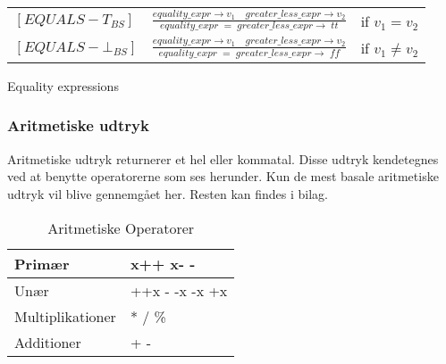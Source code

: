 \begin{semantik}
    \bgroup
    \def\arraystretch{3}
    \begin{table}[H]
    \centering
    \begin{tabular}{l c l}
        
        $[EQUALS-T_{BS}]$ &$\frac{equality\_expr \rightarrow v_1 \quad greater\_less\_expr \rightarrow v_2}{equality\_expr\;=\;greater\_less\_expr \rightarrow \; tt}$ & if $v_1 = v_2$ \\
        
        $[EQUALS-\bot_{BS}]$ &$\frac{equality\_expr \rightarrow v_1 \quad greater\_less\_expr \rightarrow v_2}{equality\_expr\;=\;greater\_less\_expr \rightarrow \; ff}$ & if $v_1 \ne v_2$ \\
        
    \end{tabular}
    \end{table}
    \egroup
    \caption{Equality expressions}
    \label{sem:equalityExpr}
\end{semantik}
\subsubsection{Aritmetiske udtryk}
Aritmetiske udtryk returnerer et hel eller kommatal. Disse udtryk kendetegnes ved at benytte operatorerne som ses herunder. Kun de mest basale aritmetiske udtryk vil blive gennemgået her. Resten kan findes i bilag.


\begin{table}[H]
    \centering
    \begin{tabular}{|l|l|}
        \hline
        \centering

        Primær             & x++ \quad x- -                                    \\ \hline
        Unær               & ++x \quad - -x \quad -x \quad +x                   \\ \hline
        Multiplikationer   & * \quad / \quad \%                                \\ \hline
        Additioner         & + \quad -                                         \\ \hline

    \end{tabular}
    \caption{Aritmetiske Operatorer}
    \label{tab:aritmetiskeOperatorer}
\end{table}

